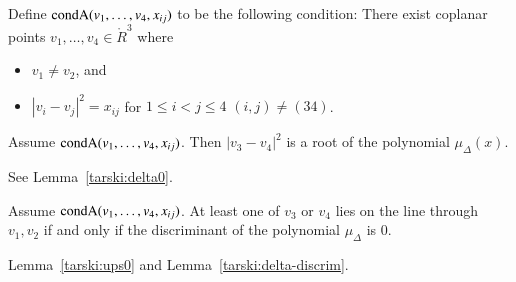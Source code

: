 \begin{tarskidata}
\begin{tarski}

\begin{definition}
Define ${\operatorname{condA}}(v_1,\ldots,v_4,x_{ij})$ to be the following condition:
There exist
coplanar points $v_1,\ldots,v_4\in\ring{R}^3$ where 
\begin{itemize}
\item  $v_1\ne v_2$, and
\item $|v_i-v_j|^2 = x_{ij}$ for $1\le i < j \le 4$  $(i,j)\ne (34)$.
\end{itemize} 
\end{definition}
\end{tarski}


\begin{tarski}

\begin{lemma}
Assume ${\operatorname{condA}}(v_1,\ldots,v_4,x_{ij})$.
Then $|v_3-v_4|^2$ is a root of the polynomial $\mu_\Delta(x)$. 
\end{lemma}

\begin{proved}  See Lemma~\ref{tarski:delta0}.
\swallowed\end{proved}
\end{tarski}



\begin{tarski}

\begin{lemma}
Assume ${\operatorname{condA}}(v_1,\ldots,v_4,x_{ij})$.
At least one of $v_3$ or $v_4$ lies on the line through $v_1,v_2$ if and only if
the discriminant of the polynomial $\mu_\Delta$ is $0$.
\end{lemma}

\begin{proved} Lemma~\ref{tarski:ups0} and Lemma~\ref{tarski:delta-discrim}. 
\swallowed\end{proved}
\end{tarski}




\end{tarskidata}
